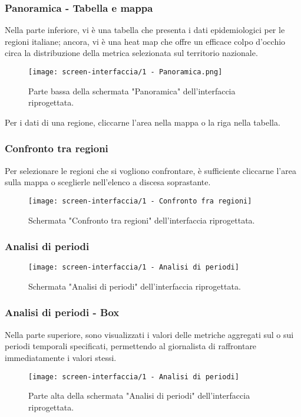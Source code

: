 \begin{frame}
    \frametitle{Panoramica - Tabella e mappa}
    Nella parte inferiore, vi è una tabella che presenta i dati epidemiologici per le regioni italiane; ancora, vi è una heat map che offre un efficace colpo d'occhio circa la distribuzione della metrica selezionata sul territorio nazionale. 
    \begin{figure}
        \centering
        \texttt{[image: screen-interfaccia/1 - Panoramica.png]}
        \caption{Parte bassa della schermata "Panoramica" dell'interfaccia riprogettata.}
    \end{figure}
    \vspace{-10pt}
    Per i dati di una regione, cliccarne l'area nella mappa o la riga nella tabella.

\end{frame}

\begin{frame}
    \frametitle{Confronto tra regioni}
    \label{confronto-regioni}
    Per selezionare le regioni che si vogliono confrontare, è sufficiente cliccarne l'area sulla mappa o sceglierle nell'elenco a discesa soprastante.
    \begin{figure}
        \centering
        \texttt{[image: screen-interfaccia/1 - Confronto fra regioni]}
        \caption{Schermata "Confronto tra regioni" dell'interfaccia riprogettata.}
    \end{figure}    

\end{frame}


\begin{frame}
    \frametitle{Analisi di periodi}
    \label{analisi-periodi}
    \begin{figure}
        \centering
        \texttt{[image: screen-interfaccia/1 - Analisi di periodi]}
        \caption{Schermata "Analisi di periodi" dell'interfaccia riprogettata.}
    \end{figure}    

\end{frame}

\begin{frame}
    \frametitle{Analisi di periodi - Box}
    Nella parte superiore, sono visualizzati i valori delle metriche aggregati sul o sui periodi temporali specificati, permettendo al giornalista di raffrontare immediatamente i valori stessi.
    \begin{figure}
        \centering
        \texttt{[image: screen-interfaccia/1 - Analisi di periodi]}
        \caption{Parte alta della schermata "Analisi di periodi" dell'interfaccia riprogettata.}
    \end{figure}    

\end{frame}

